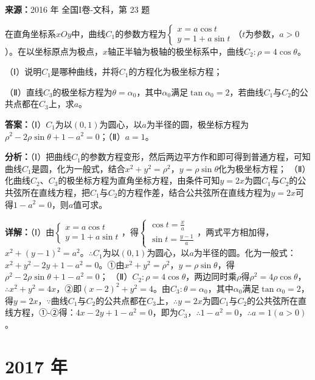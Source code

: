 \begin{question}[points=10]
\textbf{来源：}2016 年 全国I卷-文科，第 23 题\par
[选修4-4：坐标系与参数方程]

在直角坐标系$xOy$中，曲线$C_1$的参数方程为$\begin{cases} x=a\cos t \\ y=1+a\sin t \end{cases}$（$t$为参数，$a>0$）。在以坐标原点为极点，$x$轴正半轴为极轴的极坐标系中，曲线$C_2:\rho=4\cos\theta$。

（Ⅰ）说明$C_1$是哪种曲线，并将$C_1$的方程化为极坐标方程；

（Ⅱ）直线$C_3$的极坐标方程为$\theta=\alpha_0$，其中$\alpha_0$满足$\tan\alpha_0=2$，若曲线$C_1$与$C_2$的公共点都在$C_3$上，求$a$。
\begin{solution}
\textbf{答案：}（Ⅰ）$C_1$为以$(0,1)$为圆心，以$a$为半径的圆，极坐标方程为$\rho^2-2\rho\sin\theta+1-a^2=0$；（Ⅱ）$a=1$。

\textbf{分析：}（Ⅰ）把曲线$C_1$的参数方程变形，然后两边平方作和即可得到普通方程，可知曲线$C_1$是圆，化为一般式，结合$x^2+y^2=\rho^2$，$y=\rho\sin\theta$化为极坐标方程；
（Ⅱ）化曲线$C_2$、$C_3$的极坐标方程为直角坐标方程，由条件可知$y=2x$为圆$C_1$与$C_2$的公共弦所在直线方程，把$C_1$与$C_2$的方程作差，结合公共弦所在直线方程为$y=2x$可得$1-a^2=0$，则$a$值可求。

\textbf{详解：}（Ⅰ）由$\begin{cases} x=a\cos t \\ y=1+a\sin t \end{cases}$，得$\begin{cases} \cos t=\frac{x}{a} \\ \sin t=\frac{y-1}{a} \end{cases}$，两式平方相加得，$x^2+(y-1)^2=a^2$。$\therefore C_1$为以$(0,1)$为圆心，以$a$为半径的圆。化为一般式：$x^2+y^2-2y+1-a^2=0$。①由$x^2+y^2=\rho^2$，$y=\rho\sin\theta$，得$\rho^2-2\rho\sin\theta+1-a^2=0$；
（Ⅱ）$C_2:\rho=4\cos\theta$，两边同时乘$\rho$得$\rho^2=4\rho\cos\theta$，$\therefore x^2+y^2=4x$，②即$(x-2)^2+y^2=4$。由$C_3:\theta=\alpha_0$，其中$\alpha_0$满足$\tan\alpha_0=2$，得$y=2x$，$\because$曲线$C_1$与$C_2$的公共点都在$C_3$上，$\therefore y=2x$为圆$C_1$与$C_2$的公共弦所在直线方程，①-②得：$4x-2y+1-a^2=0$，即为$C_3$，$\therefore 1-a^2=0$，$\therefore a=1(a>0)$。
\end{solution}
\end{question}

\section*{2017 年}

